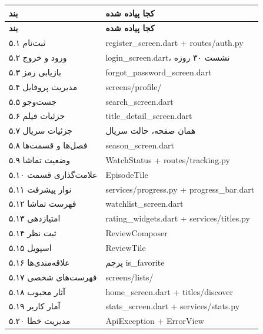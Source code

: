 \documentclass[12pt]{article}
\newcommand{\en}[1]{\textenglish{#1}}
\begin{document}
\begin{center}
\begin{longtable}{|l|p{9.3cm}|}
\hline
\textbf{بند} & \textbf{کجا پیاده شده} \\
\hline
\endfirsthead
\hline
\textbf{بند} & \textbf{کجا پیاده شده} \\
\hline
\endhead
\textenglish{۵.۱} ثبت‌نام & \en{register\_screen.dart} + \en{routes/auth.py} \\
\hline
\textenglish{۵.۲} ورود و خروج & \en{login\_screen.dart}، نشست ۳۰ روزه \\
\hline
\textenglish{۵.۳} بازیابی رمز & \en{forgot\_password\_screen.dart} \\
\hline
\textenglish{۵.۴} مدیریت پروفایل & \en{screens/profile/} \\
\hline
\textenglish{۵.۵} جست‌وجو & \en{search\_screen.dart} \\
\hline
\textenglish{۵.۶} جزئیات فیلم & \en{title\_detail\_screen.dart} \\
\hline
\textenglish{۵.۷} جزئیات سریال & همان صفحه، حالت سریال \\
\hline
\textenglish{۵.۸} فصل‌ها و قسمت‌ها & \en{season\_screen.dart} \\
\hline
\textenglish{۵.۹} وضعیت تماشا & \en{WatchStatus} + \en{routes/tracking.py} \\
\hline
\textenglish{۵.۱۰} علامت‌گذاری قسمت & \en{EpisodeTile} \\
\hline
\textenglish{۵.۱۱} نوار پیشرفت & \en{services/progress.py} + \en{progress\_bar.dart} \\
\hline
\textenglish{۵.۱۲} فهرست تماشا & \en{watchlist\_screen.dart} \\
\hline
\textenglish{۵.۱۳} امتیازدهی & \en{rating\_widgets.dart} + \en{services/titles.py} \\
\hline
\textenglish{۵.۱۴} ثبت نظر & \en{ReviewComposer} \\
\hline
\textenglish{۵.۱۵} اسپویل & \en{ReviewTile} \\
\hline
\textenglish{۵.۱۶} علاقه‌مندی‌ها & پرچم \en{is\_favorite} \\
\hline
\textenglish{۵.۱۷} فهرست‌های شخصی & \en{screens/lists/} \\
\hline
\textenglish{۵.۱۸} آثار محبوب & \en{home\_screen.dart} + \en{titles/discover} \\
\hline
\textenglish{۵.۱۹} آمار کاربر & \en{stats\_screen.dart} + \en{services/stats.py} \\
\hline
\textenglish{۵.۲۰} مدیریت خطا & \en{ApiException} + \en{ErrorView} \\
\hline
\end{longtable}
\end{center}
\end{document}
